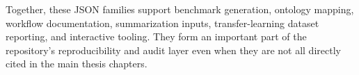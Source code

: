 Together, these JSON families support benchmark generation, ontology mapping, workflow documentation, summarization inputs, transfer-learning dataset reporting, and interactive tooling. They form an important part of the repository's reproducibility and audit layer even when they are not all directly cited in the main thesis chapters.
